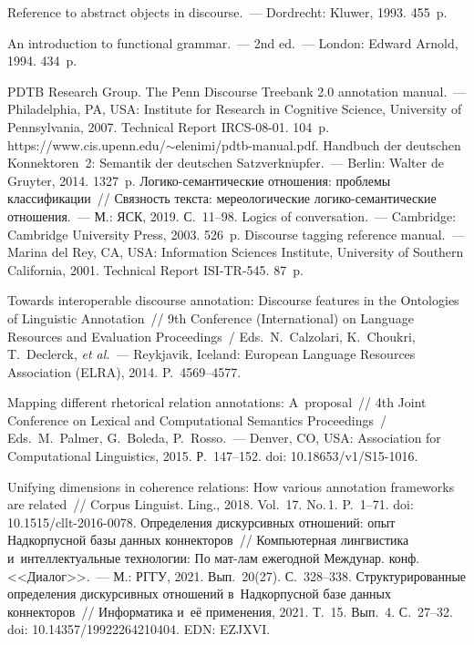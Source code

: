 \begin{multicols}{2}
{{\begin{thebibliography}{99}
 Reference to abstract objects in discourse.~--- Dordrecht: Kluwer, 1993. 455~p.

 An introduction to functional grammar.~--- 2nd ed.~--- London: 
Edward Arnold, 1994. 434~p.

PDTB Research Group. The Penn Discourse Treebank 2.0 annotation manual.~--- Philadelphia, PA, USA: Institute for Research in Cognitive Science, University 
of Pennsylvania, 2007.  Technical Report 
IRCS-08-01. 104~p. {\sf https://www.cis.upenn.edu/$\sim$elenimi/\linebreak pdtb-manual.pdf}.
 Handbuch der deutschen 
Konnektoren~2: Semantik der deutschen Satzverkn$\ddot{\mbox{u}}$pfer.~--- Berlin: Walter de Gruyter, 2014. 
1327~p.
 Логико-се\-ман\-ти\-че\-ские отношения: проблемы 
классификации~// Связность текста: мереологические ло\-ги\-ко-се\-ман\-ти\-че\-ские 
отношения.~--- М.: ЯСК, 2019. С.~11--98.
 Logics of conversation.~--- Cambridge: Cambridge University 
Press, 2003. 526~p.
 Discourse tagging reference manual.~--- Marina del Rey, CA, USA: Information Sciences Institute, University of Southern 
California, 2001.  Technical Report ISI-TR-545. 87~p.



 Towards interoperable discourse annotation: Discourse features in the 
Ontologies of Linguistic Annotation~// 9th Conference (International) on Language Resources 
and Evaluation Proceedings~/ Eds.\ N.~Calzolari, K.~Choukri, T.~Declerck, \textit{et al.}~--- Reykjavik, Iceland: European Language Resources Association 
(ELRA), 2014. P.~4569--4577.

 Mapping different rhetorical relation annotations: A~proposal~// 
4th Joint Conference on Lexical and Computational Semantics  Proceedings~/ Eds.\ M.~Palmer, G.~Boleda, P.~Rosso.~--- Denver, CO, USA: 
Association for Computational Linguistics, 2015. Р.~147--152. doi: 10.18653/v1/S15-1016.

Unifying dimensions in coherence relations: How various annotation frameworks are related~// 
Corpus Linguist. Ling., 2018. Vol.~17. No.\,1. P.~1--71. doi:  
10.1515/cllt-2016-0078.
 Определения дискурсивных отношений: опыт Надкорпусной базы 
данных коннекторов~// Компьютерная лингвистика и~интеллектуальные технологии: По 
мат-лам ежегодной \mbox{Междунар.} конф. <<Диалог>>.~--- М.: РГГУ, 2021. Вып.~20(27). 
С.~328--338.
 Структурированные определения дискурсивных 
отношений в~Надкорпусной базе данных коннекторов~// Информатика и~её применения, 
2021. Т.~15. Вып.~4. С.~27--32. doi: 10.14357/19922264210404. EDN: EZJXVI.


\end{thebibliography}}}
\end{multicols}
